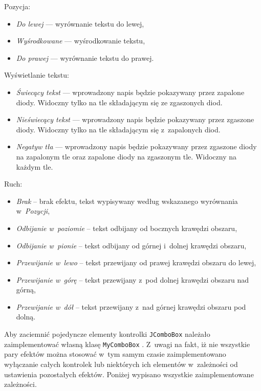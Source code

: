 Pozycja:

\begin{itemize}
	\item \textit{Do lewej} --- wyrównanie tekstu do lewej,
	\item \textit{Wyśrodkowane} --- wyśrodkowanie tekstu,
	\item \textit{Do prawej} --- wyrównanie tekstu do prawej.
\end{itemize}

Wyświetlanie tekstu:

\begin{itemize}
	\item \textit{Świecący tekst} --- wprowadzony napis będzie pokazywany przez zapalone diody. Widoczny tylko na tle składającym się ze zgaszonych diod.
	\item \textit{Nieświecący tekst} --- wprowadzony napis będzie pokazywany przez zgaszone diody. Widoczny tylko na tle składającym się z~zapalonych diod.
	\item \textit{Negatyw tła} --- wprowadzony napis będzie pokazywany przez zgaszone diody na zapalonym tle oraz zapalone diody na zgaszonym tle. Widoczny na każdym tle.
\end{itemize}

Ruch:

\begin{itemize}
	\item \textit{Brak} -- brak efektu, tekst wypisywany według wskazanego wyrównania w~\textit{Pozycji},
	\item \textit{Odbijanie w~poziomie} -- tekst odbijany od bocznych krawędzi obszaru,
	\item \textit{Odbijanie w~pionie} -- tekst odbijany od górnej i~dolnej krawędzi obszaru,
	\item \textit{Przewijanie w~lewo} -- tekst przewijany od prawej krawędzi obszaru do lewej,
	\item \textit{Przewijanie w~górę} -- tekst przewijany z~pod dolnej krawędzi obszaru nad górną,
	\item \textit{Przewijanie w~dół} -- tekst przewijany z~nad górnej krawędzi obszaru pod dolną.
\end{itemize}

Aby zaciemnić pojedyncze elementy kontrolki \texttt{JComboBox} należało zaimplementować własną klasę \texttt{MyComboBox} \cite{jcombobox}. Z~uwagi na fakt, iż nie wszystkie pary efektów można stosować w~tym samym czasie zaimplementowano wyłączanie całych kontrolek lub niektórych ich elementów w~zależności od ustawienia pozostałych efektów. Poniżej wypisano wszystkie zaimplementowane zależności.

